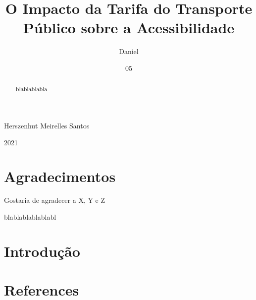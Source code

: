 \documentclass[msc,numbers]{coppe}
\begin{document}
  \title{O Impacto da Tarifa do Transporte Público sobre a Acessibilidade}
    \author{Daniel}{Herszenhut Meirelles Santos}
  

  

  \date{05}{2021}

  
  \maketitle

  \frontmatter
  \dedication{A alguém cujo valor é digno desta dedicatória.}

    \chapter*{Agradecimentos}
  Gostaria de agradecer a X, Y e Z
 \begin{abstract}
blablablabla
 \end{abstract}
  \begin{foreignabstract}
blablablablablabl
  \end{foreignabstract}
  \tableofcontents
  \listoffigures

  \listoftables
  \printlosymbols
  \printloabbreviations

  \mainmatter

  \hypertarget{intro}{%
  \chapter{Introdução}\label{intro}}

  \hypertarget{references}{%
  \chapter*{References}\label{references}}

  
  
\end{document}
